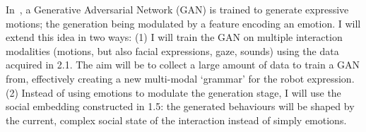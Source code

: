 In~\textcite{suguitan2020moveae}, a Generative Adversarial Network (GAN) is
trained to generate expressive motions; the generation being modulated by a
feature encoding an emotion. I will extend this idea in two ways: (1) I will
train the GAN on multiple interaction modalities (motions, but also facial
expressions, gaze, sounds) using the data acquired in 2.1. The aim will be to collect a
large amount of data to train a GAN from, effectively creating a new
multi-modal `grammar' for the robot expression.  (2) Instead of using emotions
to modulate the generation stage, I will use the social embedding constructed in
1.5: the generated behaviours will be shaped by the current, complex social
state of the interaction instead of simply emotions.
%
%
%
%
%
%
%
